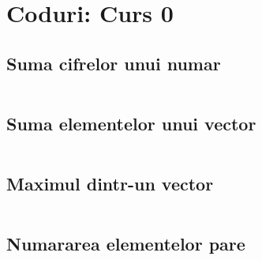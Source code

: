 \chapter{Coduri: Curs 0}

\section{Suma cifrelor unui numar}
\label{code:suma-cifrelor}
\inputminted{python}{../src/python-intro/suma-cifrelor.py}

\section{Suma elementelor unui vector}
\label{code:suma-vector}
\inputminted{python}{../src/python-intro/suma-vector.py}

\section{Maximul dintr-un vector}
\label{code:maxim-vector}
\inputminted{python}{../src/python-intro/maxim-vector.py}

\section{Numararea elementelor pare}
\label{code:numarare-conditie}
\inputminted{python}{../src/python-intro/numarare-conditie.py}
